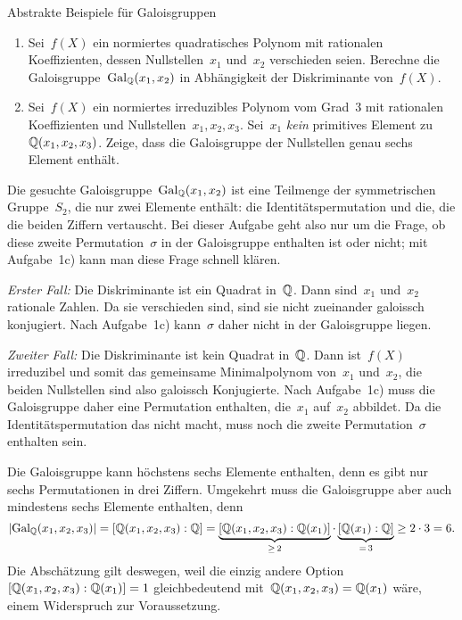 \documentclass{algblatt}
\begin{document}
\begin{aufgabe}{Abstrakte Beispiele für Galoisgruppen}
\begin{enumerate}
\item Sei~$f(X)$ ein normiertes quadratisches Polynom mit rationalen
Koeffizienten, dessen Nullstellen~$x_1$ und~$x_2$ verschieden seien.
Berechne die Galoisgruppe~$\mathrm{Gal}_{\mathbb{Q}}(x_1,x_2)$ in Abhängigkeit der Diskriminante
von~$f(X)$.

\item Sei~$f(X)$ ein normiertes irreduzibles Polynom vom Grad~$3$ mit
rationalen Koeffizienten und Nullstellen~$x_1,x_2,x_3$. Sei~$x_1$ \emph{kein}
primitives Element zu~$\mathbb{Q}(x_1,x_2,x_3)$. Zeige, dass die Galoisgruppe der
Nullstellen genau sechs Element enthält.
\end{enumerate}

\begin{loesungE}
\item Die gesuchte Galoisgruppe~$\mathrm{Gal}_{\mathbb{Q}}(x_1,x_2)$ ist eine Teilmenge der
symmetrischen Gruppe~$S_2$, die nur zwei Elemente enthält: die
Identitätspermutation und die, die die beiden Ziffern vertauscht. Bei dieser
Aufgabe geht also nur um die Frage, ob diese zweite Permutation~$\sigma$ in der
Galoisgruppe enthalten ist oder nicht; mit Aufgabe~1c) kann man diese Frage
schnell klären.

\emph{Erster Fall:} Die Diskriminante ist ein Quadrat in~$\mathbb{Q}$. Dann sind~$x_1$
und~$x_2$ rationale Zahlen. Da sie verschieden sind, sind sie nicht zueinander
galoissch konjugiert. Nach Aufgabe~1c) kann~$\sigma$ daher nicht in der
Galoisgruppe liegen.

\emph{Zweiter Fall:} Die Diskriminante ist kein Quadrat in~$\mathbb{Q}$. Dann
ist~$f(X)$ irreduzibel und somit das gemeinsame Minimalpolynom von~$x_1$
und~$x_2$, die beiden Nullstellen sind also galoissch Konjugierte. Nach
Aufgabe~1c) muss die Galoisgruppe daher eine Permutation enthalten, die~$x_1$
auf~$x_2$ abbildet. Da die Identitätspermutation das nicht macht, muss noch
die zweite Permutation~$\sigma$ enthalten sein.

\item Die Galoisgruppe kann höchstens sechs Elemente enthalten, denn es gibt
nur sechs Permutationen in drei Ziffern. Umgekehrt muss die Galoisgruppe aber
auch mindestens sechs Elemente enthalten, denn
\[ |\mathrm{Gal}_{\mathbb{Q}}(x_1,x_2,x_3)| = [\mathbb{Q}(x_1,x_2,x_3):\mathbb{Q}] =
  \underbrace{[\mathbb{Q}(x_1,x_2,x_3):\mathbb{Q}(x_1)]}_{\geq\,2} \cdot
  \underbrace{[\mathbb{Q}(x_1):\mathbb{Q}]}_{=\,3} \geq
  2 \cdot 3 = 6. \]
Die Abschätzung gilt deswegen, weil die einzig andere
Option~$[\mathbb{Q}(x_1,x_2,x_3):\mathbb{Q}(x_1)] = 1$ gleichbedeutend
mit~$\mathbb{Q}(x_1,x_2,x_3) = \mathbb{Q}(x_1)$ wäre, einem Widerspruch zur Voraussetzung.
\end{loesungE}
\end{aufgabe}
\end{document}
